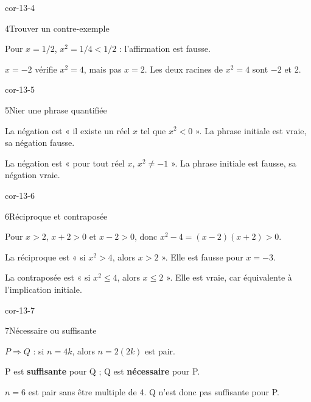 \begin{blocLivre}{cor-13-4}
\begin{corrige}{4}{Trouver un contre-exemple}
\begin{questions}
\item Pour $x=1/2$, $x^2=1/4<1/2$ : l’affirmation est fausse.
\item $x=-2$ vérifie $x^2=4$, mais pas $x=2$. Les deux racines de $x^2=4$ sont $-2$ et 2.
\end{questions}
\end{corrige}
\end{blocLivre}
\begin{blocLivre}{cor-13-5}
\begin{corrige}{5}{Nier une phrase quantifiée}
\begin{questions}
\item La négation est « il existe un réel $x$ tel que $x^2<0$ ». La phrase initiale est vraie, sa négation fausse.
\item La négation est « pour tout réel $x$, $x^2\neq-1$ ». La phrase initiale est fausse, sa négation vraie.
\end{questions}
\end{corrige}
\end{blocLivre}
\begin{blocLivre}{cor-13-6}
\begin{corrige}{6}{Réciproque et contraposée}
\begin{questions}
\item Pour $x>2$, $x+2>0$ et $x-2>0$, donc $x^2-4=(x-2)(x+2)>0$.
\item La réciproque est « si $x^2>4$, alors $x>2$ ». Elle est fausse pour $x=-3$.
\item La contraposée est « si $x^2\leq4$, alors $x\leq2$ ». Elle est vraie, car équivalente à l’implication initiale.
\end{questions}
\end{corrige}
\end{blocLivre}
\begin{blocLivre}{cor-13-7}
\begin{corrige}{7}{Nécessaire ou suffisante}
\begin{questions}
\item $P\Rightarrow Q$ : si $n=4k$, alors $n=2(2k)$ est pair.
\item P est \textbf{suffisante} pour Q ; Q est \textbf{nécessaire} pour P.
\item $n=6$ est pair sans être multiple de 4. Q n’est donc pas suffisante pour P.
\end{questions}
\end{corrige}
\end{blocLivre}
